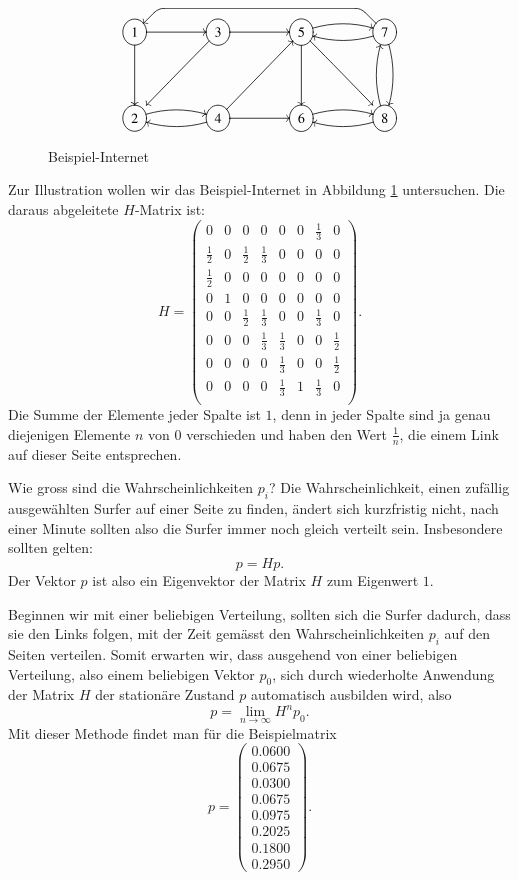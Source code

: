 \begin{figure}
\[\UseTips
\entrymodifiers={++[o][F]}
\xymatrix @=1.5cm {
1 \ar[r] \ar[d]
	& 3 \ar[r] \ar@(dl,dl)[dl]
		& 5 \ar[d] \ar@/^/[r] \ar@(dr,dr)[rd]
			& 7 \ar@/^/[d]  \ar@/^/[l]
\ar `ul^l[lll]+/u6mm/`l^dl[lll] [lll]
\\
2 \ar@/^/[r]
	& 4 \ar@/^/[l] \ar[r] \ar[ur]
		& 6 \ar@/^/[r]
			& 8 \ar@/^/[l] \ar@/^/[u]
}
\]
\caption{Beispiel-Internet\label{google-sample}}
\end{figure}
Zur Illustration wollen wir das Beispiel-Internet in Abbildung \ref{google-sample}
untersuchen.
Die daraus abgeleitete $H$-Matrix ist:
\[
H=
\begin{pmatrix}
0&0&0&0&0&0&\frac13&0\\
\frac12&0&\frac12&\frac13&0&0&0&0\\
\frac12&0&0&0&0&0&0&0\\
0&1&0&0&0&0&0&0\\
0&0&\frac12&\frac13&0&0&\frac13&0\\
0&0&0&\frac13&\frac13&0&0&\frac12\\
0&0&0&0&\frac13&0&0&\frac12\\
0&0&0&0&\frac13&1&\frac13&0\\
\end{pmatrix} .
\]
Die Summe der Elemente jeder Spalte ist $1$, denn in jeder Spalte sind ja genau
diejenigen Elemente $n$ von $0$ verschieden und haben den Wert $\frac1n$,
die einem Link auf dieser Seite entsprechen.

Wie gross sind die Wahrscheinlichkeiten $p_i$? Die Wahrscheinlichkeit, einen zufällig
ausgewählten Surfer auf einer Seite zu finden, ändert sich kurzfristig nicht, nach
einer Minute sollten also die Surfer immer noch gleich verteilt sein.
Insbesondere
sollten gelten:
\[
p=Hp.
\]
Der Vektor $p$ ist also ein Eigenvektor der Matrix $H$ zum Eigenwert $1$.

Beginnen wir mit einer beliebigen Verteilung, sollten sich die Surfer dadurch,
dass sie den Links folgen, mit der Zeit gemässt den Wahrscheinlichkeiten $p_i$
auf den Seiten verteilen.
Somit erwarten wir, dass ausgehend von einer beliebigen
Verteilung, also einem beliebigen Vektor $p_0$, sich durch wiederholte Anwendung der
Matrix $H$ der stationäre Zustand $p$ automatisch ausbilden wird, also
\[
p=\lim_{n\to\infty}H^np_0.
\]
Mit dieser Methode findet man für die Beispielmatrix
\[
p=\left(
\begin{matrix}
0.0600\\0.0675\\0.0300\\0.0675\\0.0975\\0.2025\\0.1800\\0.2950
\end{matrix}
\right).
\]

